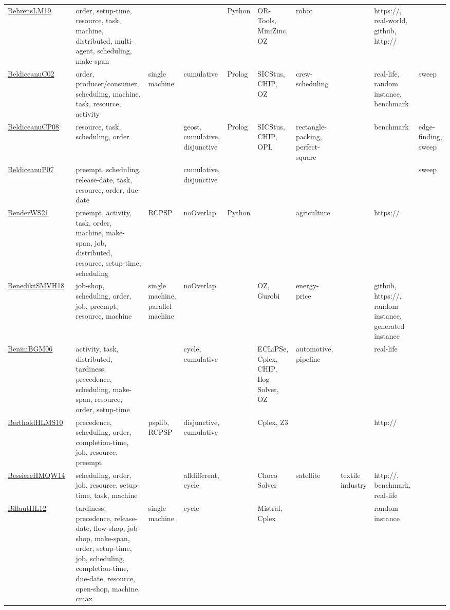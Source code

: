 {\begin{longtable}{p{3cm}p{4cm}p{2cm}p{2cm}p{2cm}p{2cm}p{2cm}p{2cm}p{2cm}p{2cm}}
\href{papers/BehrensLM19.pdf}{BehrensLM19}~\cite{BehrensLM19} & order, setup-time, resource, task, machine, distributed, multi-agent, scheduling, make-span &  &  & Python & OR-Tools, MiniZinc, OZ & robot &  & https://, real-world, github, http:// & \\
\href{papers/BeldiceanuC02.pdf}{BeldiceanuC02}~\cite{BeldiceanuC02} & order, producer/consumer, scheduling, machine, task, resource, activity & single machine & cumulative & Prolog & SICStus, CHIP, OZ & crew-scheduling &  & real-life, random instance, benchmark & sweep\\
\href{papers/BeldiceanuCP08.pdf}{BeldiceanuCP08}~\cite{BeldiceanuCP08} & resource, task, scheduling, order &  & geost, cumulative, disjunctive & Prolog & SICStus, CHIP, OPL & rectangle-packing, perfect-square &  & benchmark & edge-finding, sweep\\
\href{papers/BeldiceanuP07.pdf}{BeldiceanuP07}~\cite{BeldiceanuP07} & preempt, scheduling, release-date, task, resource, order, due-date &  & cumulative, disjunctive &  &  &  &  &  & sweep\\
\href{papers/BenderWS21.pdf}{BenderWS21}~\cite{BenderWS21} & preempt, activity, task, order, machine, make-span, job, distributed, resource, setup-time, scheduling & RCPSP & noOverlap & Python &  & agriculture &  & https:// & \\
\href{papers/BenediktSMVH18.pdf}{BenediktSMVH18}~\cite{BenediktSMVH18} & job-shop, scheduling, order, job, preempt, resource, machine & single machine, parallel machine & noOverlap &  & OZ, Gurobi & energy-price &  & github, https://, random instance, generated instance & \\
\href{papers/BeniniBGM06.pdf}{BeniniBGM06}~\cite{BeniniBGM06} & activity, task, distributed, tardiness, precedence, scheduling, make-span, resource, order, setup-time &  & cycle, cumulative &  & ECLiPSe, Cplex, CHIP, Ilog Solver, OZ & automotive, pipeline &  & real-life & \\
\href{papers/BertholdHLMS10.pdf}{BertholdHLMS10}~\cite{BertholdHLMS10} & precedence, scheduling, order, completion-time, job, resource, preempt & psplib, RCPSP & disjunctive, cumulative &  & Cplex, Z3 &  &  & http:// & \\
\href{papers/BessiereHMQW14.pdf}{BessiereHMQW14}~\cite{BessiereHMQW14} & scheduling, order, job, resource, setup-time, task, machine &  & alldifferent, cycle &  & Choco Solver & satellite & textile industry & http://, benchmark, real-life & \\
\href{papers/BillautHL12.pdf}{BillautHL12}~\cite{BillautHL12} & tardiness, precedence, release-date, flow-shop, job-shop, make-span, order, setup-time, job, scheduling, completion-time, due-date, resource, open-shop, machine, cmax & single machine & cycle &  & Mistral, Cplex &  &  & random instance & \\

\end{longtable}}
